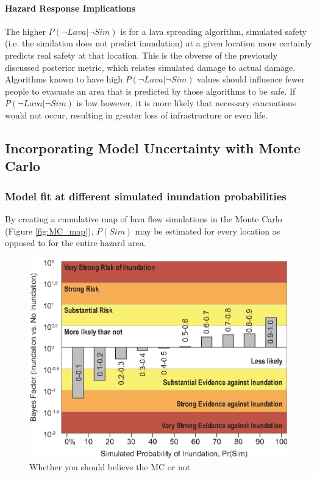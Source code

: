 \documentclass[12pt,letter]{article}
\begin{document}
		\paragraph{Hazard Response Implications} The higher $P(\neg Lava|\neg Sim)$ is for a lava spreading algorithm, simulated safety (i.e. the similation does not predict inundation) at a given location more certainly predicts real safety at that location. This is the obverse of the previously discussed posterior metric, which relates simulated damage to actual damage. Algorithms known to have high $P(\neg Lava|\neg Sim)$ values should influence fewer people to evacuate an area that is predicted by those algorithms to be safe. If $P(\neg Lava|\neg Sim)$ is low however, it is more likely that necessary evacuations would not occur, resulting in greater loss of infrastructure or even life.

	\subsection{Incorporating Model Uncertainty with Monte Carlo}\label{sec:lava_MC}

\subsubsection{Model fit at different simulated inundation probabilities}
By creating a cumulative map of lava flow simulations in the Monte Carlo (Figure \ref{fig:MC_map}), $P(Sim)$ may be estimated for every location as opposed to for the entire hazard area.


\begin{figure}[!h]
		\centering
		\includegraphics[width=0.7\linewidth]{figures/LR_bayes}
		\caption{Whether you should believe the MC or not}
		\label{fig_bayesfactor}
	\end{figure}
\end{document}
